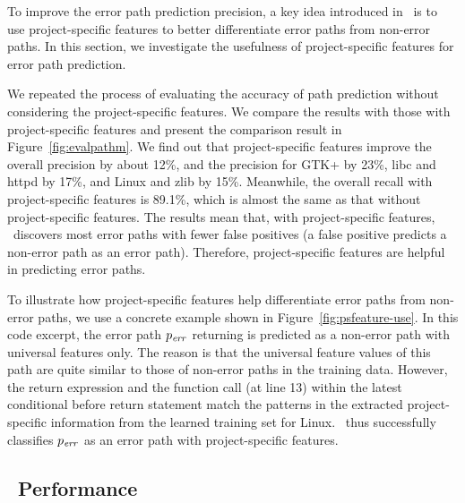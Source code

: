 \documentclass[12pt]{report}	%
\begin{document}
To improve the error path prediction precision,
a key idea introduced in \newTool\ is to use project-specific features
to better differentiate error paths from non-error paths.
%
In this section, we investigate the usefulness of project-specific 
features for error path prediction.

We repeated the process of evaluating the accuracy of path prediction
without considering the project-specific features.
We compare the results with those with project-specific features
and present the comparison result in Figure~\ref{fig:evalpathm}.
%
We find out that project-specific features improve the overall precision by 
about 12\%, and the precision for GTK+ by 23\%, libc and httpd by 17\%, 
and Linux and zlib by 15\%. 
Meanwhile, the overall recall with project-specific features is 89.1\%,
which is almost the same
as that without project-specific features.
The results mean that, with project-specific features,
\newTool\ discovers most error paths
with fewer false positives (a false positive predicts a non-error path as an error path).
%
Therefore, project-specific 
features are helpful in predicting error paths.


To illustrate how project-specific features help differentiate error paths 
from non-error paths,
we use a concrete example shown in Figure~\ref{fig:psfeature-use}.
%
In this code excerpt,
the error path $p_{\it{err}}$ returning  
is predicted as a non-error path with universal features only.
%
The reason is that the universal feature values of this path are quite similar to those of non-error paths in the training data.
%
However, the return expression  and
the function call  (at line 13) within the latest conditional before return statement
match the patterns in the extracted project-specific information 
from the learned training set for Linux.
\newTool\ thus successfully classifies $p_{\it{err}}$ as an error path with project-specific features.

\subsection{\newTool\ Performance}
\label{sec:app:eval:performance}
\end{document}

